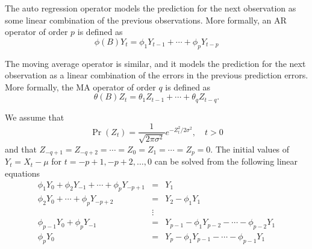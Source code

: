 \documentclass[english,12pt]{article}
\begin{document}
The  auto regression operator models the prediction for the next
observation  as some linear combination of the previous observations.
More formally, an AR operator of order $p$ is defined as
\begin{equation}
\phi(B) Y_t= \phi_1 Y_{t-1}   + \cdots +  \phi_{p} Y_{t-p}
\end{equation}

The moving average operator is similar, and it models the prediction
for the next observation as a linear combination of the errors in the
previous prediction errors.  More formally, the MA operator of order
$q$ is defined as
\begin{equation}
\theta(B) Z_t =   \theta_{1} Z_{t-1} + \cdots + \theta_{q} Z_{t-q}.
\end{equation}

We assume that
\begin{equation}
\Pr(Z_t) = \frac{1}{\sqrt{2 \pi \sigma^2}} e^{-Z^2_t/2 \sigma^2}, \quad t > 0
\end{equation}
and that  $Z_{-q+1} = Z_{-q+2} = \cdots = Z_0 = Z_1 = \cdots = Z_p =
0$. The initial values of $Y_t=X_t-\mu$ for $t=-p+1, -p+2, \dots,
0$ can be solved from the following linear equations
\begin{eqnarray}
\phi_1 Y_0 + \phi_2 Y_{-1} + \cdots + \phi_p Y_{-p+1} &=& Y_1 \nonumber\\
\phi_2 Y_0 + \cdots + \phi_p Y_{-p+2} &=& Y_2 - \phi_1 Y_1  \nonumber\\
&\vdots& \nonumber\\
\phi_{p-1} Y_0 + \phi_p Y_{-1} &=& Y_{p-1} - \phi_1 Y_{p-2} - \cdots -
\phi_{p-2} Y_1 \nonumber \\
\phi_p Y_0  &=& Y_p - \phi_1 Y_{p-1} - \cdots - \phi_{p-1} Y_{1} \label{eq:init_Y}
\end{eqnarray}
\end{document}
